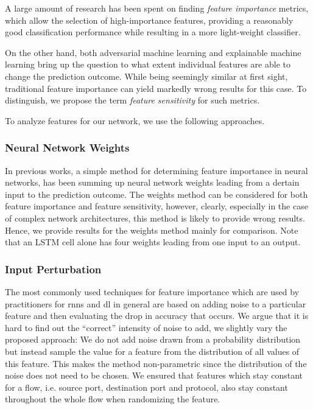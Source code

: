 \documentclass[conference]{IEEEtran}
\begin{document}
A large amount of research has been spent on finding \emph{feature importance} metrics, which allow the selection  of high-importance features, providing a reasonably good classification performance while resulting in a more light-weight classifier.

On the other hand, both adversarial machine learning and explainable machine learning bring up the question to what extent individual features are able to change the prediction outcome. While being seemingly similar at first sight, traditional feature importance can yield markedly wrong results for this case.  To distinguish, we propose the term \emph{feature sensitivity} for such metrics.

To analyze features for our network, we use the following approaches.

\subsubsection{Neural Network Weights}
In previous works, a simple method for determining feature importance in neural networks, has been summing up neural network weights leading from a dertain input to the prediction outcome. The weights method can be considered for both feature importance and feature sensitivity, however, clearly, especially in the case of complex network architectures, this method is likely to provide wrong results. Hence, we provide results for the weights method mainly for comparison. Note that an LSTM cell alone has four weights leading from one input to an output. 

\subsubsection{Input Perturbation}

 The most commonly used techniques for feature importance which are used by practitioners for \glspl{rnn} \cite{stackexchange_cross_validated_neural_2019} and \gls{dl} \cite{stackexchange_cross_validated_feature_2016} in general are based on adding noise to a particular feature and then evaluating the drop in accuracy that occurs. We argue that it is hard to find out the ``correct'' intensity of noise to add, we slightly vary the proposed approach: We do not add noise drawn from a probability distribution but instead sample the value for a feature from the distribution of all values of this feature. This makes the method non-parametric since the distribution of the noise does not need to be chosen. We ensured that features which stay constant for a flow, i.e. source port, destination port and protocol, also stay constant throughout the whole flow when randomizing the feature.
\end{document}
